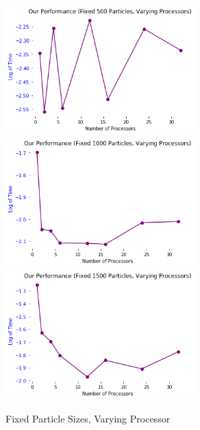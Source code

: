 \documentclass[12pt]{article}
\begin{document}
\begin{figure}[h]
  \caption{Fixed Particle Sizes, Varying Processor}
  \centering 
  \includegraphics[width = 0.65\textwidth]{500_fixed_particles_varying_processor.png}
  \includegraphics[width = 0.65\textwidth]{1000_fixed_particles_varying_processor.png}
  \includegraphics[width = 0.65\textwidth]{1500_fixed_particles_varying_processor.png}
\end{figure}
\end{document}

